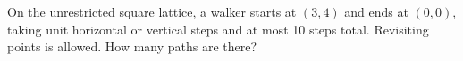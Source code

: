 On the unrestricted square lattice, a walker starts at $(3,4)$ and ends at $(0,0)$, taking unit horizontal or vertical steps and at most 10 steps total. Revisiting points is allowed. How many paths are there?
